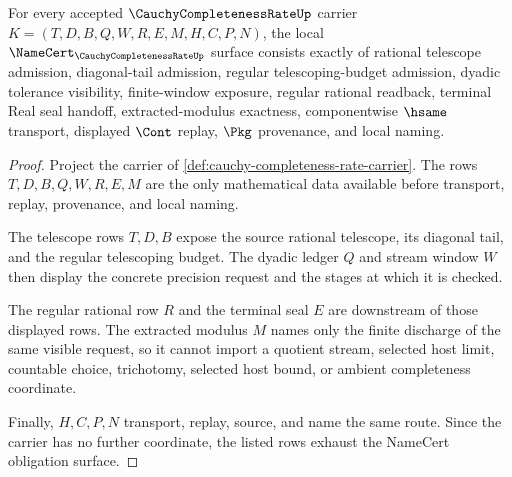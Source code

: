 \begin{theorem}
\label{thm:cauchy-completeness-rate-namecert-obligations}
For every accepted $\CauchyCompletenessRateUp$ carrier $K=(T,D,B,Q,W,R,E,M,H,C,P,N)$, the local $\NameCert_{\CauchyCompletenessRateUp}$ surface consists exactly of rational telescope admission, diagonal-tail admission, regular telescoping-budget admission, dyadic tolerance visibility, finite-window exposure, regular rational readback, terminal Real seal handoff, extracted-modulus exactness, componentwise $\hsame$ transport, displayed $\Cont$ replay, $\Pkg$ provenance, and local naming.
\end{theorem}
\begin{proof}
Project the carrier of \autoref{def:cauchy-completeness-rate-carrier}. The rows $T,D,B,Q,W,R,E,M$ are the only mathematical data available before transport, replay, provenance, and local naming.

The telescope rows $T,D,B$ expose the source rational telescope, its diagonal tail, and the regular telescoping budget. The dyadic ledger $Q$ and stream window $W$ then display the concrete precision request and the stages at which it is checked.

The regular rational row $R$ and the terminal seal $E$ are downstream of those displayed rows. The extracted modulus $M$ names only the finite discharge of the same visible request, so it cannot import a quotient stream, selected host limit, countable choice, trichotomy, selected host bound, or ambient completeness coordinate.

Finally, $H,C,P,N$ transport, replay, source, and name the same route. Since the carrier has no further coordinate, the listed rows exhaust the NameCert obligation surface.
\end{proof}

